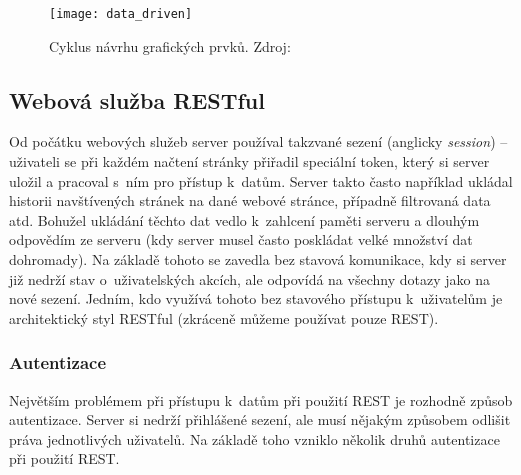 \begin{figure}[h]
\centering
\texttt{[image: data\_driven]}
\caption[Cyklus návrhu grafických prvků]{Cyklus návrhu grafických prvků. Zdroj: \cite{the-ux-book}}
\label{data-cycle}
\end{figure}

\subsection{Webová služba RESTful}
\par Od počátku webových služeb server používal takzvané sezení (anglicky \textit{session}) -- uživateli se při každém načtení stránky přiřadil speciální token, který si server uložil a pracoval s~ním pro přístup k~datům. Server takto často například ukládal historii navštívených stránek na dané webové stránce, případně filtrovaná data atd. Bohužel ukládání těchto dat vedlo k~zahlcení paměti serveru a dlouhým odpovědím ze serveru (kdy server musel často poskládat velké množství dat dohromady). Na základě tohoto se zavedla bez stavová komunikace, kdy si server již nedrží stav o~uživatelských akcích, ale odpovídá na všechny dotazy jako na nové sezení. Jedním, kdo využívá tohoto bez stavového přístupu k~uživatelům je architektický styl RESTful (zkráceně můžeme používat pouze REST). \cite{rest-cookbook}

\subsubsection{Autentizace}
Největším problémem při přístupu k~datům při použití REST je rozhodně způsob autentizace. Server si nedrží přihlášené sezení, ale musí nějakým způsobem odlišit práva jednotlivých uživatelů. Na základě toho vzniklo několik druhů autentizace při použití REST. \cite{rest-cookbook}

